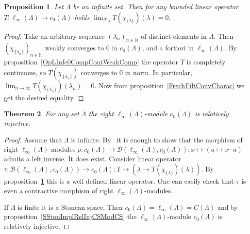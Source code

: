 \documentclass[12pt]{article}
\newtheorem{theorem}{Theorem}[section]
\newtheorem{proposition}[theorem]{Proposition}
\begin{document}
\begin{proposition}\label{OpLInfc0DiagConv0} Let $\Lambda$ be an infinite set.
    Then for any bounded linear operator $T:\ell_\infty(\Lambda)\to
        c_0(\Lambda)$ holds $\lim_{\mathcal{F}_{\Lambda}}T(\chi_{\{\lambda
            \}})(\lambda)=0$.
\end{proposition}
\begin{proof} Take an arbitrary sequence ${(\lambda_n)}_{n\in\mathbb{N}}$ of
    distinct elements in $\Lambda$. Then
    ${(\chi_{\{\lambda_n\}})}_{n\in\mathbb{N}}$ weakly converges to 0 in
    $c_0(\Lambda)$, and a fortiori in $\ell_\infty(\Lambda)$. By
    proposition~\ref{OpLInfc0CompContWeakComp} the operator $T$ is completely
    continuous, so $T(\chi_{\{\lambda_n\}})$ converges to 0 in norm. In
    particular, $\lim_{n\to\infty} T(\chi_{\{\lambda_n\}})(\lambda_n)=0$. Now
    from proposition~\ref{FrechFiltConvCharac} we get the desired equality.
\end{proof}

\begin{theorem}\label{RelInjLInfModc0} For any set $\Lambda$ the right
    $\ell_\infty(\Lambda)$-module $c_0(\Lambda)$ is relatively injective.
\end{theorem}
\begin{proof} Assume that $\Lambda$ is infinite. By~\cite[proposition
        IV.1.39]{HelHomolBanTopAlg} it is enough to show that the morphism of
    right $\ell_\infty(\Lambda)$-modules
    $\rho:c_0(\Lambda)\to\mathcal{B}(\ell_\infty(\Lambda),
        c_0(\Lambda)):x\mapsto(a\mapsto x\cdot a)$ admits a left inverse. It
    does exist. Consider linear operator
    $\tau:\mathcal{B}(\ell_\infty(\Lambda), c_0(\Lambda))\to c_0(\Lambda):
        T\mapsto(\lambda\to T(\chi_{\{\lambda \}})(\lambda))$. By
    proposition~\ref{OpLInfc0DiagConv0} this is a well defined linear
    operator. One can easily check that $\tau$ is even a contractive
    morphism of right $\ell_\infty(\Lambda)$-modules.

    If $\Lambda$ is finite it is a Stonean space. Then
    $c_0(\Lambda)=\ell_\infty(\Lambda)=C(\Lambda)$ and by
    proposition~\ref{SStonImplRelInjCSModCS} the $\ell_\infty(\Lambda)$-module
    $c_0(\Lambda)$ is relatively injective.
\end{proof}

\end{document}
